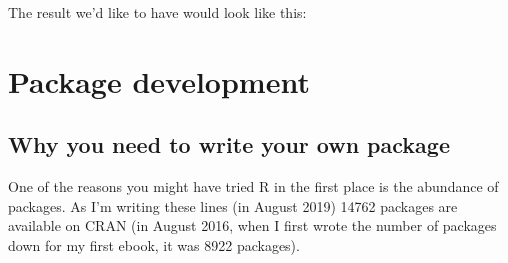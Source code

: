 \documentclass[
]{article}
\newenvironment{Shaded}{\begin{snugshade}}{\end{snugshade}}
\newcommand{\DecValTok}[1]{\textcolor[rgb]{0.00,0.00,0.81}{#1}}
\newcommand{\NormalTok}[1]{#1}
\newcommand{\OperatorTok}[1]{\textcolor[rgb]{0.81,0.36,0.00}{\textbf{#1}}}
\newcommand{\StringTok}[1]{\textcolor[rgb]{0.31,0.60,0.02}{#1}}
\begin{document}
The result we'd like to have would look like this:

\begin{Shaded}
\end{Shaded}

\hypertarget{package-development}{%
\section{Package development}\label{package-development}}

\hypertarget{why-you-need-to-write-your-own-package}{%
\subsection{Why you need to write your own package}\label{why-you-need-to-write-your-own-package}}

One of the reasons you might have tried R in the first place is the abundance of packages. As I'm
writing these lines (in August 2019) 14762 packages are available on CRAN (in August 2016, when
I first wrote the number of packages down for my first ebook, it was 8922 packages).
\end{document}
